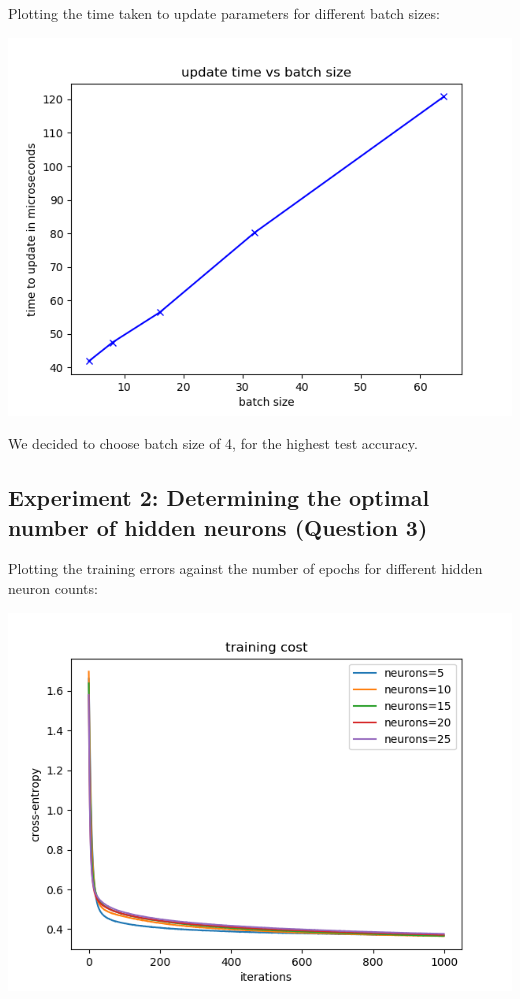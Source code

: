 Plotting the time taken to update parameters for different batch sizes:

\begin{center}
    \includegraphics[width=\imgw]{images/p1a2_batch_times.png}   
\end{center}

We decided to choose batch size of 4, for the highest test accuracy. 

\subsection*{Experiment 2: Determining the optimal number of hidden neurons
(Question 3)}

Plotting the training errors against the number of epochs for different hidden
neuron counts:

\begin{center}
    \includegraphics[width=\imgw]{images/p1a3_neuron_cost.png}   
\end{center}

